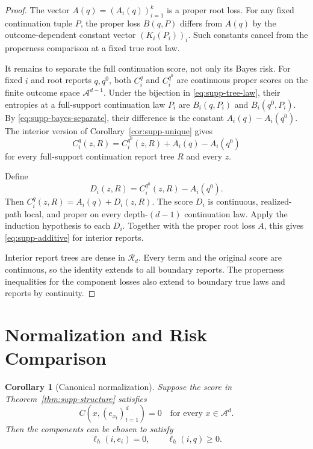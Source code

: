 \documentclass[twoside]{article}
\newtheorem{corollary}[theorem]{Corollary}
\newcommand{\cA}{\mathcal A}
\newcommand{\cR}{\mathcal R}
\newcommand{\1}{\mathbf 1}
\begin{document}
\begin{proof}
The vector $A(q)=(A_i(q))_{i=1}^k$ is a proper root loss. For any fixed
continuation tuple $P$, the proper loss $B(q,P)$ differs from $A(q)$ by the
outcome-dependent constant vector $(K_i(P_i))_i$. Such constants cancel from
the properness comparison at a fixed true root law.

It remains to separate the full continuation score, not only its Bayes risk.
For fixed $i$ and root reports $q,q^0$, both $C_i^q$ and $C_i^{q^0}$ are
continuous proper scores on the finite outcome space $\cA^{d-1}$. Under the
bijection in \eqref{eq:supp-tree-law}, their entropies at a full-support
continuation law $P_i$ are $B_i(q,P_i)$ and $B_i(q^0,P_i)$. By
\eqref{eq:supp-bayes-separate}, their difference is the constant
$A_i(q)-A_i(q^0)$. The interior version of
Corollary~\ref{cor:supp-unique} gives
\begin{equation}
 C_i^q(z,R)=C_i^{q^0}(z,R)+A_i(q)-A_i(q^0)
 \label{eq:supp-score-separate}
\end{equation}
for every full-support continuation report tree $R$ and every $z$.

Define
\begin{equation*}
 D_i(z,R)=C_i^{q^0}(z,R)-A_i(q^0).
\end{equation*}
Then $C_i^q(z,R)=A_i(q)+D_i(z,R)$. The score $D_i$ is continuous,
realized-path local, and proper on every depth-$(d-1)$ continuation law.
Apply the induction hypothesis to each $D_i$. Together with the proper root
loss $A$, this gives \eqref{eq:supp-additive} for interior reports.

Interior report trees are dense in $\cR_d$. Every term and the original
score are continuous, so the identity extends to all boundary reports. The
properness inequalities for the component losses also extend to boundary
true laws and reports by continuity.
\end{proof}

\section{Normalization and Risk Comparison}
\label{app:risk}

\begin{corollary}[Canonical normalization]
\label{cor:supp-normalize}
Suppose the score in Theorem~\ref{thm:supp-structure} satisfies
\begin{equation}
 C(x,(e_{x_t})_{t=1}^d)=0\quad\text{for every }x\in\cA^d.
 \label{eq:supp-endpoint}
\end{equation}
Then the components can be chosen to satisfy
\begin{equation*}
 \ell_h(i,e_i)=0,\qquad \ell_h(i,q)\geq0.
\end{equation*}
\end{corollary}
\end{document}
